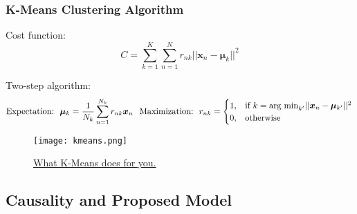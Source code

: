 \documentclass[11pt]{beamer}
\begin{document}
\begin{frame}
  \frametitle{\normalsize{\textbf{
        K-Means Clustering Algorithm
  }}} 

  \scriptsize{
  
  \textbullet \: Cost function:
  $$
  C = \sum\limits_{k=1}^{K}\sum\limits_{n=1}^{N}r_{nk} || \bm{x}_n - \bm{\mu}_k ||^2
  $$

  \textbullet \: Two-step algorithm:
  $$
  \text{Expectation: \:} \bm{\mu}_k = \frac{1}{N_k} \sum\limits_{n=1}^{N_k}
  r_{nk} \bm{x}_n \hspace{0.25cm} \text{Maximization: \:} 
  r_{nk} = \begin{cases}
    1, & \text{if } k = \text{arg min}_{k'} || \bm{x}_n - \bm{\mu}_{k'} ||^2 \\
    0, & \text{otherwise}
  \end{cases}
  $$
  
  \begin{figure}[h!]
    \centering
    \texttt{[image: kmeans.png]} 
    \caption*{\scriptsize{
        \href{https://github.com/MihailaDumitru/K-Means_Clustering/blob/master/README.md}{What
        K-Means does for you.}
    }}
  \end{figure}  

}
  
\end{frame}

\subsection{Causality and Proposed Model}
\end{document}
